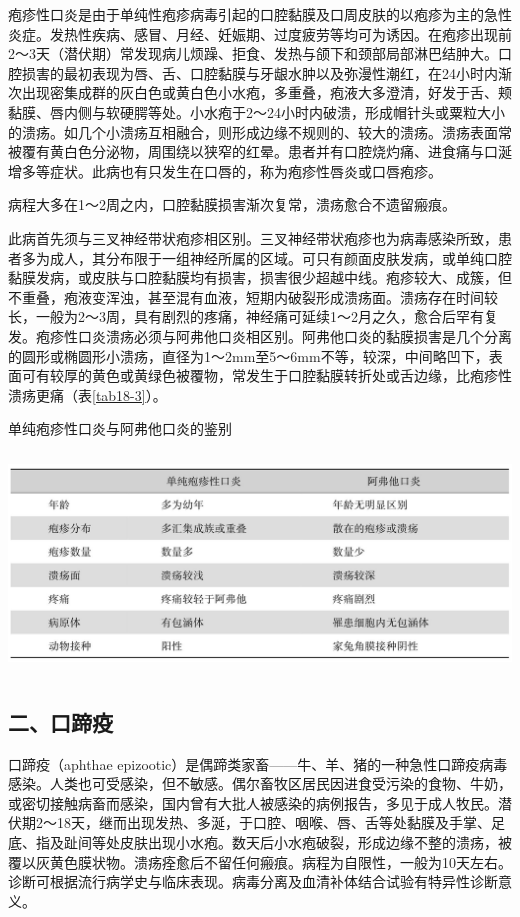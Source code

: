 疱疹性口炎是由于单纯性疱疹病毒引起的口腔黏膜及口周皮肤的以疱疹为主的急性炎症。发热性疾病、感冒、月经、妊娠期、过度疲劳等均可为诱因。在疱疹出现前2～3天（潜伏期）常发现病儿烦躁、拒食、发热与颌下和颈部局部淋巴结肿大。口腔损害的最初表现为唇、舌、口腔黏膜与牙龈水肿以及弥漫性潮红，在24小时内渐次出现密集成群的灰白色或黄白色小水疱，多重叠，疱液大多澄清，好发于舌、颊黏膜、唇内侧与软硬腭等处。小水疱于2～24小时内破溃，形成帽针头或粟粒大小的溃疡。如几个小溃疡互相融合，则形成边缘不规则的、较大的溃疡。溃疡表面常被覆有黄白色分泌物，周围绕以狭窄的红晕。患者并有口腔烧灼痛、进食痛与口涎增多等症状。此病也有只发生在口唇的，称为疱疹性唇炎或口唇疱疹。

病程大多在1～2周之内，口腔黏膜损害渐次复常，溃疡愈合不遗留瘢痕。

此病首先须与三叉神经带状疱疹相区别。三叉神经带状疱疹也为病毒感染所致，患者多为成人，其分布限于一组神经所属的区域。可只有颜面皮肤发病，或单纯口腔黏膜发病，或皮肤与口腔黏膜均有损害，损害很少超越中线。疱疹较大、成簇，但不重叠，疱液变浑浊，甚至混有血液，短期内破裂形成溃疡面。溃疡存在时间较长，一般为2～3周，具有剧烈的疼痛，神经痛可延续1～2月之久，愈合后罕有复发。疱疹性口炎溃疡必须与阿弗他口炎相区别。阿弗他口炎的黏膜损害是几个分离的圆形或椭圆形小溃疡，直径为1～2mm至5～6mm不等，较深，中间略凹下，表面可有较厚的黄色或黄绿色被覆物，常发生于口腔黏膜转折处或舌边缘，比疱疹性溃疡更痛（表\ref{tab18-3}）。

\begin{table}[htbp]
\centering
\caption{单纯疱疹性口炎与阿弗他口炎的鉴别}
\label{tab18-3}
\includegraphics[width=5.88542in,height=2.30208in]{./images/Image00116.jpg}
\end{table}

\subsection{二、口蹄疫}

口蹄疫（aphthae
epizootic）是偶蹄类家畜------牛、羊、猪的一种急性口蹄疫病毒感染。人类也可受感染，但不敏感。偶尔畜牧区居民因进食受污染的食物、牛奶，或密切接触病畜而感染，国内曾有大批人被感染的病例报告，多见于成人牧民。潜伏期2～18天，继而出现发热、多涎，于口腔、咽喉、唇、舌等处黏膜及手掌、足底、指及趾间等处皮肤出现小水疱。数天后小水疱破裂，形成边缘不整的溃疡，被覆以灰黄色膜状物。溃疡痊愈后不留任何瘢痕。病程为自限性，一般为10天左右。诊断可根据流行病学史与临床表现。病毒分离及血清补体结合试验有特异性诊断意义。

